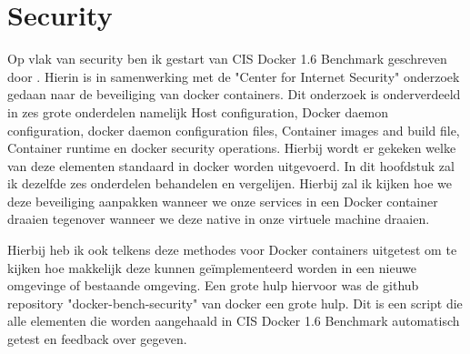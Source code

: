 \chapter{Security}

Op vlak van security ben ik gestart van CIS Docker 1.6 Benchmark geschreven door \cite{PravinGoyal2015}. Hierin is in samenwerking met de "Center for Internet Security" onderzoek gedaan naar de beveiliging van docker containers. Dit onderzoek is onderverdeeld in zes grote onderdelen namelijk Host configuration, Docker daemon configuration, docker daemon configuration files, Container images and build file, Container runtime en docker security operations. Hierbij wordt er gekeken welke van deze elementen standaard in docker worden uitgevoerd. In dit hoofdstuk zal ik dezelfde zes onderdelen behandelen en vergelijen. Hierbij zal ik kijken hoe we deze beveiliging aanpakken wanneer we onze services in een Docker container draaien tegenover wanneer we deze native in onze virtuele machine draaien.


Hierbij heb ik ook telkens deze methodes voor Docker containers uitgetest om te kijken hoe makkelijk deze kunnen geïmplementeerd worden in een nieuwe omgevinge of bestaande omgeving. Een grote hulp hiervoor was de github repository "docker-bench-security" van docker een grote hulp. Dit is een script die alle elementen die worden aangehaald in CIS Docker 1.6 Benchmark automatisch getest en feedback over gegeven.

